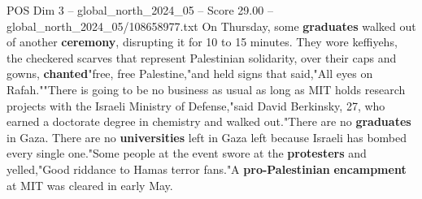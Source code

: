 \begin{textsample}{POS Dim 3 – global\_north\_2024\_05 – Score 29.00 – global\_north\_2024\_05/108658977.txt}
On Thursday, some \textbf{graduates} walked out of another \textbf{ceremony}, disrupting it for 10 to 15 minutes.
They wore keffiyehs, the checkered scarves that represent Palestinian solidarity, over their caps and gowns, \textbf{chanted}"free, free Palestine,"and held signs that said,"All eyes on Rafah.""There is going to be no business as usual as long as MIT holds research projects with the Israeli Ministry of Defense,"said David Berkinsky, 27, who earned a doctorate degree in chemistry and walked out."There are no \textbf{graduates} in Gaza.
There are no \textbf{universities} left in Gaza left because Israeli has bombed every single one."Some people at the event swore at the \textbf{protesters} and yelled,"Good riddance to Hamas terror fans."A \textbf{pro-Palestinian} \textbf{encampment} at MIT was cleared in early May.

\end{textsample}
